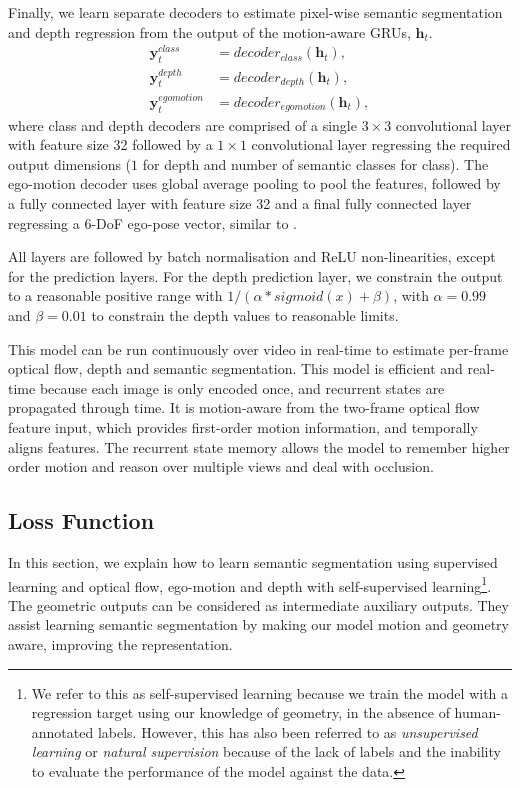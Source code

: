Finally, we learn separate decoders to estimate pixel-wise semantic segmentation and depth regression from the output of the motion-aware GRUs, $\mathbf{h}_t$.
\begin{align}
\mathbf{y}^{class}_t &= decoder_{class}(\mathbf{h}_t), \\
\mathbf{y}^{depth}_t &= decoder_{depth}(\mathbf{h}_t), \\
\mathbf{y}^{egomotion}_t &= decoder_{egomotion}(\mathbf{h}_t),
\end{align}
where class and depth decoders are comprised of a single $3\times 3$ convolutional layer with feature size 32 followed by a $1 \times 1$ convolutional layer regressing the required output dimensions ($1$ for depth and number of semantic classes for class). The ego-motion decoder uses global average pooling to pool the features, followed by a fully connected layer with feature size 32 and a final fully connected layer regressing a 6-DoF ego-pose vector, similar to \cite{zhou2017unsupervised}.

All layers are followed by batch normalisation and ReLU non-linearities, except for the prediction layers. For the depth prediction layer, we constrain the output to a reasonable positive range with $1/(\alpha * sigmoid (x) + \beta)$, with $\alpha = 0.99$ and $\beta = 0.01$ to constrain the depth values to reasonable limits.

This model can be run continuously over video in real-time to estimate per-frame optical flow, depth and semantic segmentation. This model is efficient and real-time because each image is only encoded once, and recurrent states are propagated through time. It is motion-aware from the two-frame optical flow feature input, which provides first-order motion information, and temporally aligns features. The recurrent state memory allows the model to remember higher order motion and reason over multiple views and deal with occlusion.

\subsection{Loss Function}

In this section, we explain how to learn semantic segmentation using supervised learning and optical flow, ego-motion and depth with self-supervised learning\footnote{We refer to this as self-supervised learning because we train the model with a regression target using our knowledge of geometry, in the absence of human-annotated labels. However, this has also been referred to as \textit{unsupervised learning} \cite{garg2016unsupervised,monodepth17,zhou2017unsupervised} or \textit{natural supervision} \cite{koltun2017natural} because of the lack of labels and the inability to evaluate the performance of the model against the data.}. The geometric outputs can be considered as intermediate auxiliary outputs. They assist learning semantic segmentation by making our model motion and geometry aware, improving the representation.

